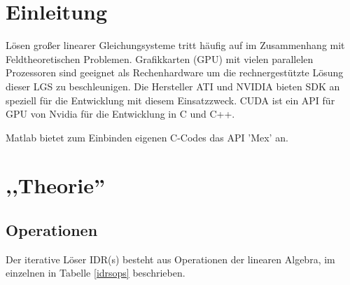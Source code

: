 \documentclass[journal]{IEEEtran}
\begin{document}
\section{Einleitung}
%
%
%
%
 Lösen großer linearer Gleichungsysteme tritt häufig auf im Zusammenhang
mit Feldtheoretischen Problemen.
Grafikkarten (GPU) mit vielen parallelen Prozessoren
sind geeignet als Rechenhardware um die rechnergestützte Lösung dieser LGS zu beschleunigen.
Die Hersteller ATI und NVIDIA bieten SDK an speziell für die Entwicklung mit
diesem Einsatzzweck. CUDA \cite{cudapg} ist ein API für GPU von Nvidia für die Entwicklung in C und C++.
\par Matlab bietet zum Einbinden eigenen C-Codes das API 'Mex' an.

\section{,,Theorie''}


\subsection{Operationen}

Der iterative Löser IDR(s) \cite{idrs} besteht aus Operationen \cite{idrsm}
der linearen Algebra, im einzelnen in Tabelle \ref{idrsops} beschrieben.
\end{document}
